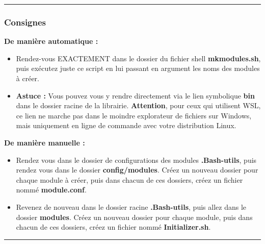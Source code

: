 \documentclass[a4paper,10pt]{article}
\begin{document}

\color{blue}\par\noindent\rule{\textwidth}{0.4pt}\color{white}

\color{blue}
\subsubsection{Consignes}\color{white}
\textbf{De manière automatique :}
\begin{itemize}
    \item Rendez-vous EXACTEMENT dans le dossier du fichier shell \textbf{\color{lime}mkmodules.sh}, puis exécutez juste\linebreak
    ce script en lui passant en argument les noms des modules à créer.\\[1\baselineskip]

    \item \textbf{Astuce :} Vous pouvez vous y rendre directement via le lien symbolique \textbf{\color{lime}bin} dans le dossier racine de la librairie. \textbf{Attention}, pour ceux qui utilisent WSL, ce lien ne marche pas dans le moindre explorateur de fichiers sur Windows, mais uniquement en ligne de commande avec votre distribution Linux.\\[1\baselineskip]
\end{itemize}

\textbf{De manière manuelle :}
\begin{itemize}
    \item  Rendez vous dans le dossier de configurations des modules \textbf{\color{lime}.Bash-utils}, puis rendez vous dans
    le dossier \textbf{\color{lime}config/modules}. Créez un nouveau dossier pour chaque module à créer, puis dans chacun de ces dossiers, créez un fichier nommé \textbf{\color{lime}module.conf}.\\[1\baselineskip]

    \item Revenez de nouveau dans le dossier racine \textbf{\color{lime}.Bash-utils}, puis allez dans le dossier \textbf{\color{lime}modules}.\linebreak
    Créez un nouveau dossier pour chaque module, puis dans chacun de ces dossiers, créez un fichier nommé \textbf{\color{lime}Initializer.sh}.
\end{itemize}


\color{green}\par\noindent\rule{\textwidth}{0.4pt}\color{white}
\end{document}
